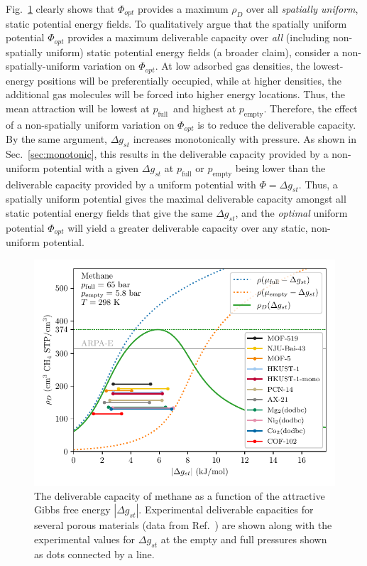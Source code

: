 \documentclass[twoside,twocolumn,9pt]{article}
\newcommand\V{\Phi}
\newcommand\pfull{\ensuremath{p_{\text{full}}}}
\newcommand\pempty{\ensuremath{p_{\text{empty}}}}
\newcommand\gst{\ensuremath{\Delta g_{st}}}
\begin{document}
Fig.~\ref{fig:methane-298-D} clearly shows that $\V_{opt}$ provides a maximum
$\rho_D$ over all \emph{spatially uniform}, static potential energy fields. To
qualitatively argue that the spatially uniform potential $\V_{opt}$ provides a
maximum deliverable capacity over \emph{all} (including non-spatially uniform)
static potential energy fields (a broader claim), consider a
non-spatially-uniform variation on $\V_{opt}$. 
At low adsorbed gas densities, the lowest-energy positions will be preferentially occupied, while
at higher densities, the additional gas molecules will be forced into higher
energy locations. Thus, the mean attraction will be lowest at \pfull\ and
highest at \pempty. 
Therefore, the effect of a non-spatially uniform variation on $\V_{opt}$ is to reduce the deliverable capacity.
By the same argument, $\gst$ increases monotonically with
pressure. As shown in Sec.~\ref{sec:monotonic}, this results in
the deliverable capacity provided by a non-uniform potential with a given $\gst$ at $\pfull$ or $\pempty$ being lower than the
deliverable capacity provided by a uniform potential with $\V=\gst$. Thus, a spatially uniform potential gives the maximal
deliverable capacity amongst all static potential energy fields that give the
same $\gst$, and the \emph{optimal} uniform potential $\V_{opt}$ will yield a
greater deliverable capacity over any static, non-uniform potential.

\begin{figure}
    \centering
    \includegraphics[width=0.95\columnwidth]{methane-298-n-vs-G}
    \caption{The deliverable capacity of methane as a function of the attractive Gibbs free energy $|\gst|$.
    Experimental deliverable capacities for several porous materials (data from Ref.~\cite{mason2014evaluating, furukawa2009storage, tian2018sol, gandara2014high, zhang2017fine}) are shown along with the experimental values for $\gst$ at the empty and full pressures shown as dots connected by a line.}
    \label{fig:methane-298-D}
\end{figure}
\end{document}
